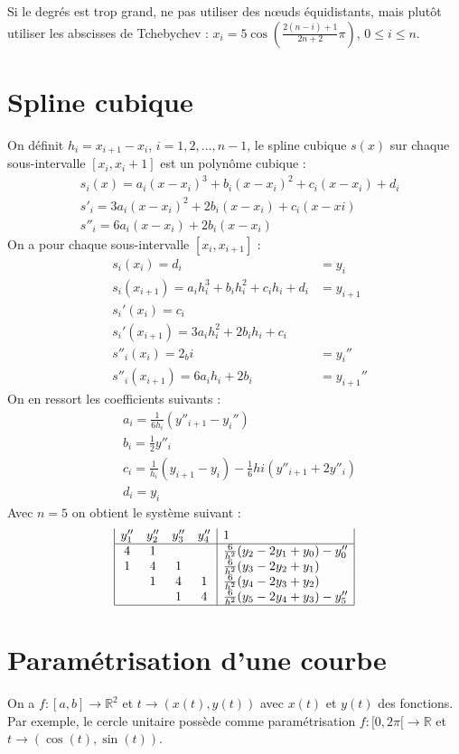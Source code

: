 \documentclass[a4paper,9pt]{extarticle}
\begin{document}
\begin{multicols*}{2}
Si le degrés est trop grand, ne pas utiliser des nœuds équidistants, mais plutôt utiliser les abscisses de Tchebychev : $x_i=5\cos(\frac{2(n-i)+1}{2n+2}\pi)$, $0\leq i\leq n$.

\section{Spline cubique}

On définit $h_i=x_{i+1}-x_i$, $i=1,2,...,n-1$, le spline cubique $s(x)$ sur chaque sous-intervalle $[x_i,x_i+1]$ est un polynôme cubique :
\begin{align*}
& s_i(x)=a_i(x-x_i)^3+b_i(x-x_i)^2+c_i(x-x_i)+d_i \\
& s'_i=3a_i(x-x_i)^2+2b_i(x-x_i)+c_i(x-xi) \\
& s''_i=6a_i(x-x_i)+2b_i(x-x_i)
\end{align*}
On a pour chaque sous-intervalle $[x_i,x_{i+1}]$ :
\begin{align*}
& s_i(x_i) = d_i &= y_i\\
& s_i(x_{i+1}) = a_ih_i^3+b_ih_i^2+c_ih_i+d_i &= y_{i+1}\\
& s_i'(x_i) = c_i\\
& s_i'(x_{i+1}) = 3a_ih_i^2+2b_ih_i+c_i \\
& s''_i(x_i) = 2_bi &=y_i''\\
& s''_i(x_{i+1}) = 6a_ih_i+2b_i &= y_{i+1}''
\end{align*}
On en ressort les coefficients suivants :
\begin{align*}
& a_i = \frac{1}{6h_i}(y''_{i+1}-y_i'')\\
& b_i = \frac{1}{2}y''_i\\
& c_i = \frac{1}{h_i}(y_{i+1}-y_i)-\frac{1}{6}hi(y''_{i+1}+2y''_i)\\
& d_i = y_i
\end{align*}
Avec $n=5$ on obtient le système suivant :
$$
\begin{array}{|cccc|l|}
y_1'' & y_2'' & y_3'' & y_4'' & 1 \\
\hline
4 & 1 &   &   & \frac{6}{h^2}(y_2-2y_1+y_0)-y''_0 \\
1 & 4 & 1 &   & \frac{6}{h^2}(y_3-2y_2+y_1) \\
  & 1 & 4 & 1 & \frac{6}{h^2}(y_4-2y_3+y_2) \\
  &   & 1 & 4 & \frac{6}{h^2}(y_5-2y_4+y_3)-y''_5 \\ \hline
\end{array}
$$

\section{Paramétrisation d'une courbe}
On a $f:[a,b] \rightarrow \mathbb{R}^2$ et $t \rightarrow (x(t),y(t))$ avec $x(t)$ et $y(t)$ des fonctions. Par exemple, le cercle unitaire possède comme paramétrisation $f:[0,2\pi[ \rightarrow \mathbb{R}$ et $t\rightarrow (\cos(t),\sin(t))$.


\end{multicols*}
\end{document}
